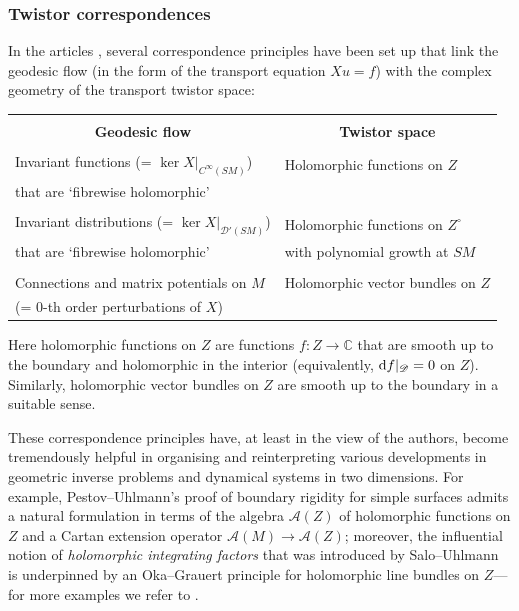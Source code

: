 \documentclass[pdftex]{sigma}
\numberwithin{equation}{section}
\theoremstyle{definition}
\newcommand{\C}{\mathbb{C}} %
\newcommand{\1}{{\bf 1}}
\begin{document}
\subsubsection{Twistor correspondences}\label{s_correspondences}
In the articles \cite{BLP24,BoPa23}, several correspondence principles have been set up that link the geodesic flow (in the form of the transport equation $Xu=f$) with the complex geometry of the transport twistor space:
	
	\begin{center}
\begin{tabular}{|l||l|}
	\hline
	&\\[-1em]
	\multicolumn{1}{|c||}{\textbf{Geodesic flow}} &\multicolumn{1}{c|}{\textbf{Twistor space}}\\
	\hline
	& \\[-1em]
		Invariant functions (= $\ker X|_{C^\infty(SM)}$)& Holomorphic functions on $Z$\\
		that are `fibrewise holomorphic' &\\
		&\\[-.8em]
		Invariant distributions (= $\ker X|_{\mathcal D'(SM)}$) & Holomorphic functions on $Z^\circ$\\that are `fibrewise holomorphic'& with polynomial growth at $SM$\\
	&\\[-.8em]
		Connections and matrix potentials on $M$ & Holomorphic vector bundles on $Z$\\
		(= $0$-th order perturbations of $X$) &\\
		\hline
	\end{tabular}
	\end{center}

\noindent	Here holomorphic functions on $Z$ are functions $f\colon Z\rightarrow \C$ that are smooth up to the boundary and holomorphic in the interior (equivalently, ${\rm d}f|_\mathscr D = 0$ on $Z$). Similarly, holomorphic vector bundles on $Z$ are smooth up to the boundary in a suitable sense.


	
 These correspondence principles have, at least in the view of the authors, become tremendously helpful in organising and reinterpreting various developments in geometric inverse problems and dynamical systems in two dimensions. For example, Pestov--Uhlmann's proof of boundary rigidity for simple surfaces \cite{PeUh05} admits a natural formulation in terms of the algebra $\mathcal A(Z)$ of holomorphic functions on $Z$ and a Cartan extension operator $\mathcal A(M)\to \mathcal A(Z)$; moreover, the influential notion of {\it holomorphic integrating factors} that was introduced by Salo--Uhlmann~\cite{SaUh11}
is underpinned by an Oka--Grauert principle for holomorphic line bundles on $Z$---for more examples we refer to \cite{BLP24,BoPa23}.
\end{document}
